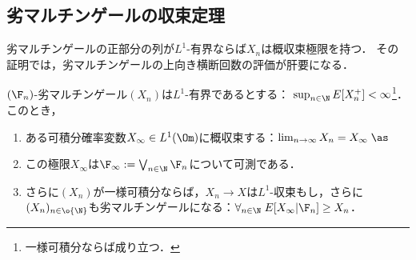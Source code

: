 \documentclass[uplatex,dvipdfmx]{jsreport}
\begin{document}
\subsection{劣マルチンゲールの収束定理}

\begin{tcolorbox}[colframe=ForestGreen, colback=ForestGreen!10!white,breakable,colbacktitle=ForestGreen!40!white,coltitle=black,fonttitle=\bfseries\sffamily,
title=]
    劣マルチンゲールの正部分の列が$L^1$-有界ならば$X_n$は概収束極限を持つ．
    その証明では，劣マルチンゲールの上向き横断回数の評価が肝要になる．
\end{tcolorbox}

\begin{theorem}
    $(\F_n)$-劣マルチンゲール$(X_n)$は$L^1$-有界であるとする：
    $\sup_{n\in\N}E[X_n^+]<\infty$\footnote{一様可積分ならば成り立つ．}．
    このとき，
    \begin{enumerate}
        \item ある可積分確率変数$X_\infty\in L^1(\Om)$に概収束する：$\lim_{n\to\infty}X_n=X_\infty\;\as$
        \item この極限$X_\infty$は$\F_\infty:=\bigvee_{n\in\N}\F_n$について可測である．
        \item さらに$(X_n)$が一様可積分ならば，$X_n\to X$は$L^1$-収束もし，さらに$(X_n)_{n\in\o{\N}}$も劣マルチンゲールになる：$\forall_{n\in\N}\;E[X_\infty|\F_n]\ge X_n$．
    \end{enumerate}
\end{theorem}
\end{document}
